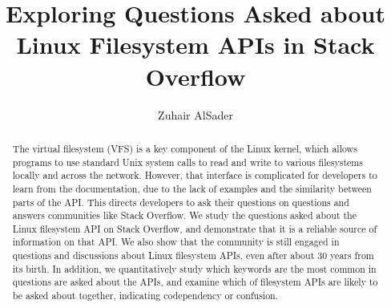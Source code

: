 \documentclass[sigconf]{acmart}
\begin{document}
\title{Exploring Questions Asked about Linux Filesystem APIs in Stack Overflow}

\author{Zuhair AlSader}

\begin{abstract}
  The virtual filesystem (VFS) is a key component of the Linux kernel, which allows programs to use standard Unix system calls to read and write to various filesystems locally and across the network. However, that interface is  complicated for developers to learn from the documentation, due to the lack of examples and the similarity between parts of the API. This directs developers to ask their questions on questions and answers communities like Stack Overflow. We study the questions asked about the Linux filesystem API on Stack Overflow, and demonstrate that it is a reliable source of information on that API.
  We also show that the community is still engaged in questions and discussions about Linux filesystem APIs, even after about 30 years from its birth.
  In addition, we quantitatively study which keywords are the most common in questions are asked about the APIs, and  examine which of filesystem APIs are likely to be asked about together, indicating codependency or confusion.
\end{abstract}



\maketitle





\end{document}
